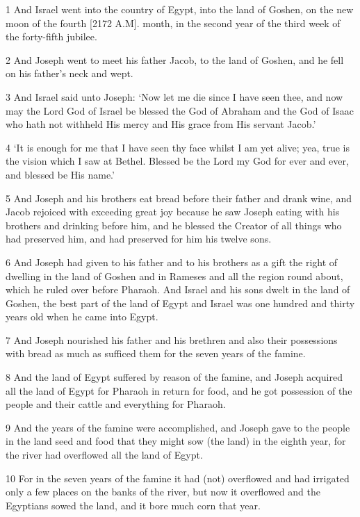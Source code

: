 \par 1 And Israel went into the country of Egypt, into the land of Goshen, on the new moon of the fourth [2172 A.M]. month, in the second year of the third week of the forty-fifth jubilee.
\par 2 And Joseph went to meet his father Jacob, to the land of Goshen, and he fell on his father's neck and wept.
\par 3 And Israel said unto Joseph: ‘Now let me die since I have seen thee, and now may the Lord God of Israel be blessed the God of Abraham and the God of Isaac who hath not withheld His mercy and His grace from His servant Jacob.’
\par 4 ‘It is enough for me that I have seen thy face whilst I am yet alive; yea, true is the vision which I saw at Bethel. Blessed be the Lord my God for ever and ever, and blessed be His name.’
\par 5 And Joseph and his brothers eat bread before their father and drank wine, and Jacob rejoiced with exceeding great joy because he saw Joseph eating with his brothers and drinking before him, and he blessed the Creator of all things who had preserved him, and had preserved for him his twelve sons.
\par 6 And Joseph had given to his father and to his brothers as a gift the right of dwelling in the land of Goshen and in Rameses and all the region round about, which he ruled over before Pharaoh. And Israel and his sons dwelt in the land of Goshen, the best part of the land of Egypt and Israel was one hundred and thirty years old when he came into Egypt.
\par 7 And Joseph nourished his father and his brethren and also their possessions with bread as much as sufficed them for the seven years of the famine.
\par 8 And the land of Egypt suffered by reason of the famine, and Joseph acquired all the land of Egypt for Pharaoh in return for food, and he got possession of the people and their cattle and everything for Pharaoh.
\par 9 And the years of the famine were accomplished, and Joseph gave to the people in the land seed and food that they might sow (the land) in the eighth year, for the river had overflowed all the land of Egypt.
\par 10 For in the seven years of the famine it had (not) overflowed and had irrigated only a few places on the banks of the river, but now it overflowed and the Egyptians sowed the land, and it bore much corn that year.

